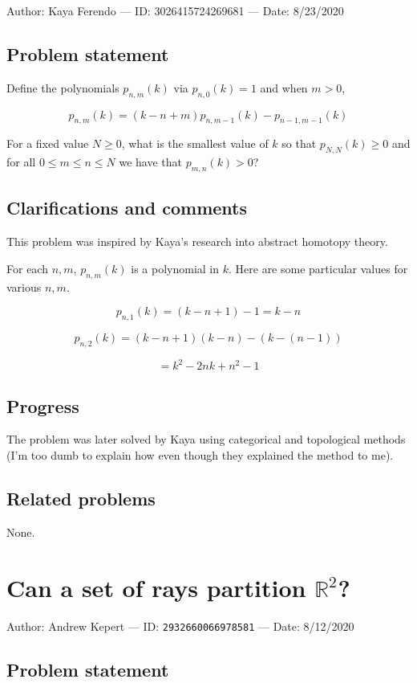 \documentclass[10pt]{article}
\begin{document}
Author: Kaya Ferendo --- ID: 3026415724269681 --- Date: 8/23/2020

\subsection{Problem statement}

Define the polynomials $p_{n,m}(k)$ via $p_{n,0}(k)=1$ and when $m>0$,

$$p_{n,m}(k)=(k-n+m)p_{n,m-1}(k)-p_{n-1,m-1}(k)$$

For a fixed value $N\geq 0$, what is the smallest value of $k$ so that $p_{N,N}(k)\geq 0$ and for all $0\leq m\leq n\leq N$ we have that $p_{m,n}(k)>0$?

\subsection{Clarifications and comments}

This problem was inspired by Kaya's research into abstract homotopy theory.

For each $n,m$, $p_{n,m}(k)$ is a polynomial in $k$. Here are some particular values for various $n,m$.

$$p_{n,1}(k)=(k-n+1)-1=k-n$$

$$p_{n,2}(k)=(k-n+1)(k-n)-(k-(n-1))$$

$$=k^2-2nk+n^2-1$$

\subsection{Progress}

The problem was later solved by Kaya using categorical and topological methods (I'm too dumb to explain how even though they explained the method to me).

\subsection{Related problems}

None.

\pagebreak

\section{Can a set of rays partition $\mathbb{R}^2$?}

Author: Andrew Kepert --- ID: \verb`2932660066978581` --- Date: 8/12/2020

\subsection{Problem statement}
\end{document}
